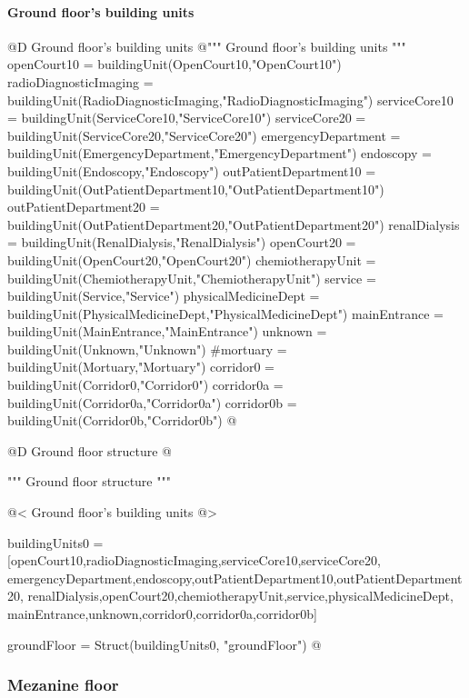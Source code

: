 \documentclass[11pt,oneside]{article}    %
\begin{document}
\paragraph{Ground floor's building units}
@D Ground floor's building units 
@{""" Ground floor's building units """
openCourt10 = buildingUnit(OpenCourt10,"OpenCourt10")
radioDiagnosticImaging = buildingUnit(RadioDiagnosticImaging,"RadioDiagnosticImaging")
serviceCore10 = buildingUnit(ServiceCore10,"ServiceCore10")
serviceCore20 = buildingUnit(ServiceCore20,"ServiceCore20")
emergencyDepartment = buildingUnit(EmergencyDepartment,"EmergencyDepartment")
endoscopy = buildingUnit(Endoscopy,"Endoscopy")
outPatientDepartment10 = buildingUnit(OutPatientDepartment10,"OutPatientDepartment10")
outPatientDepartment20 = buildingUnit(OutPatientDepartment20,"OutPatientDepartment20")
renalDialysis = buildingUnit(RenalDialysis,"RenalDialysis")
openCourt20 = buildingUnit(OpenCourt20,"OpenCourt20")
chemiotherapyUnit = buildingUnit(ChemiotherapyUnit,"ChemiotherapyUnit")
service = buildingUnit(Service,"Service")
physicalMedicineDept = buildingUnit(PhysicalMedicineDept,"PhysicalMedicineDept")
mainEntrance = buildingUnit(MainEntrance,"MainEntrance")
unknown = buildingUnit(Unknown,"Unknown")
#mortuary = buildingUnit(Mortuary,"Mortuary")
corridor0 = buildingUnit(Corridor0,"Corridor0")
corridor0a = buildingUnit(Corridor0a,"Corridor0a")
corridor0b = buildingUnit(Corridor0b,"Corridor0b")
@}

@D Ground floor structure
@{""" Ground floor structure """

@< Ground floor's building units @>

buildingUnits0 = [openCourt10,radioDiagnosticImaging,serviceCore10,serviceCore20,
    emergencyDepartment,endoscopy,outPatientDepartment10,outPatientDepartment20,
    renalDialysis,openCourt20,chemiotherapyUnit,service,physicalMedicineDept,
    mainEntrance,unknown,corridor0,corridor0a,corridor0b]
    
groundFloor = Struct(buildingUnits0, "groundFloor")
@}

\subsubsection{Mezanine floor}
\end{document}
